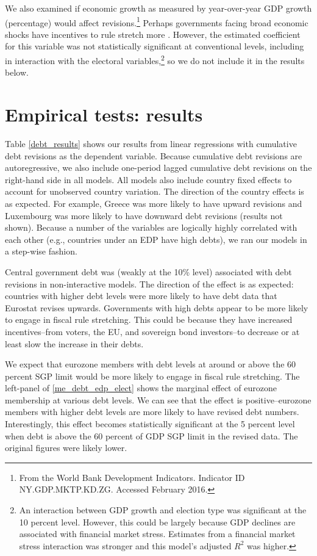 \documentclass[]{article}
\begin{document}
We also examined if economic growth as measured by year-over-year GDP growth (percentage) would affect revisions.\footnote{From the World Bank Development Indicators. Indicator ID NY.GDP.MKTP.KD.ZG. Accessed February 2016.} Perhaps governments facing broad economic shocks have incentives to rule stretch more \citep{DeCastro2013}. However, the estimated coefficient for this variable was not statistically significant at conventional levels, including in interaction with the electoral variables,\footnote{An interaction between GDP growth and election type was significant at the 10 percent level. However, this could be largely because GDP declines are associated with financial market stress. Estimates from a financial market stress interaction was stronger and this model's adjusted $R^{2}$ was higher.} so we do not include it in the results below.

\section{Empirical tests: results}

Table \ref{debt_results} shows our results from linear regressions with cumulative debt revisions as the dependent variable. Because cumulative debt revisions are autoregressive, we also include one-period lagged cumulative debt revisions on the right-hand side in all models. All models also include country fixed effects to account for unobserved country variation. The direction of the country effects is as expected. For example, Greece was more likely to have upward revisions and Luxembourg was more likely to have downward debt revisions (results not shown). Because a number of the variables are logically highly correlated with each other (e.g., countries under an EDP have high debts), we ran our models in a step-wise fashion.

Central government debt was (weakly at the 10\% level) associated with debt revisions in non-interactive models. The direction of the effect is as expected: countries with higher debt levels were more likely to have debt data that Eurostat revises upwards. Governments with high debts appear to be more likely to engage in fiscal rule stretching. This could be because they have increased incentives--from voters, the EU, and sovereign bond investors--to decrease or at least slow the increase in their debts.

We expect that eurozone members with debt levels at around or above the 60 percent SGP limit would be more likely to engage in fiscal rule stretching. The left-panel of \ref{me_debt_edp_elect} shows the marginal effect of eurozone membership at various debt levels. We can see that the effect is positive--eurozone members with higher debt levels are more likely to have revised debt numbers. Interestingly, this effect becomes statistically significant at the 5 percent level when debt is above the 60 percent of GDP SGP limit in the revised data. The original figures were likely lower.
\end{document}
